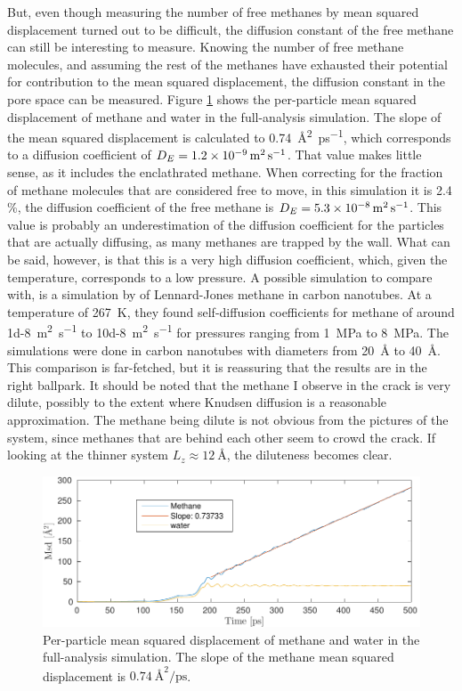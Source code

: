 But, even though measuring the number of free methanes by mean squared displacement turned out to be difficult, the diffusion constant of the free methane can still be interesting to measure. Knowing the number of free methane molecules, and assuming the rest of the methanes have exhausted their potential for contribution to the mean squared displacement, the diffusion constant in the pore space can be measured. Figure \ref{fig:msq_methane_crack} shows the per-particle mean squared displacement of methane and water in the full-analysis simulation. The slope of the mean squared displacement is calculated to \SI{0.74}{\angstrom\squared\per\pico\second}, which corresponds to a diffusion coefficient of $D_E = \SI{1.2d-9}{\meter\squared\per\second}$. That value makes little sense, as it includes the enclathrated methane. When correcting for the fraction of methane molecules that are considered free to move, in this simulation it is 2.4 \%, the diffusion coefficient of the free methane is $D_E = \SI{5.3d-8}{\meter\squared\per\second}$. This value is probably an underestimation of the diffusion coefficient for the particles that are actually diffusing, as many methanes are trapped by the wall. What can be said, however, is that this is a very high diffusion coefficient, which, given the temperature, corresponds to a low pressure. A possible simulation to compare with, is a simulation by \citet{Cao2004} of Lennard-Jones methane in carbon nanotubes. At a temperature of \SI{267}{\kelvin}, they found self-diffusion coefficients for methane of around \SI{1d-8}{\meter\squared\per\second} to \SI{10d-8}{\meter\squared\per\second} for pressures ranging from \SI{1}{\mega\pascal} to \SI{8}{\mega\pascal}. The simulations were done in carbon nanotubes with diameters from \SI{20}{\angstrom} to \SI{40}{\angstrom}. This comparison is far-fetched, but it is reassuring that the results are in the right ballpark. It should be noted that the methane I observe in the crack is very dilute, possibly to the extent where Knudsen diffusion is a reasonable approximation. The methane being dilute is not obvious from the pictures of the system, since methanes that are behind each other seem to crowd the crack. If looking at the thinner system $L_z \approx \SI{12}{\angstrom}$, the diluteness becomes clear.

\begin{figure}
\centering
\includegraphics[width=14cm]{../figures/thesis/methane_crack_diffusion.pdf}
\caption{Per-particle mean squared displacement of methane and water in the full-analysis simulation. The slope of the methane mean squared displacement is $\SI{0.74}{\angstrom\squared\per\pico\second}$.}
\label{fig:msq_methane_crack}
\end{figure}

